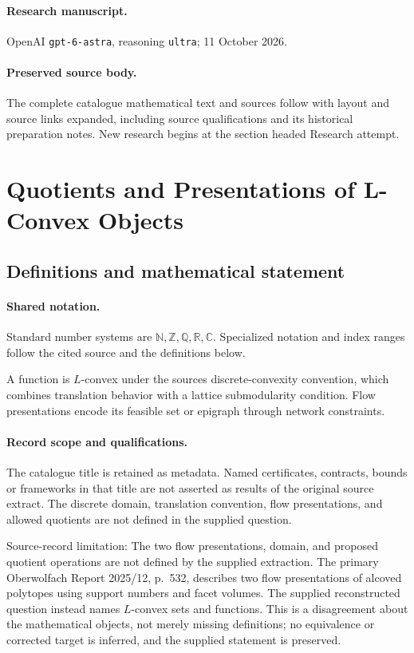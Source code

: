 \documentclass[11pt]{article}
\begin{document}
\paragraph{Research manuscript.} OpenAI \texttt{gpt-6-astra}, reasoning \texttt{ultra}; 11 October 2026.
\paragraph{Preserved source body.} The complete catalogue mathematical text and sources follow with layout and source links expanded, including source qualifications and its historical preparation notes. New research begins at the section headed Research attempt.

\section{Quotients and Presentations of L-Convex Objects}\label{statement}

\subsection{Definitions and mathematical statement}

\paragraph{Shared notation.}Standard number systems are $\mathbb N,\mathbb Z,\mathbb Q,\mathbb R,\mathbb C$. Specialized notation and index ranges follow the cited source and the definitions below.


A function is $L$-convex under the source\textquotesingle s discrete-convexity convention, which combines translation behavior with a lattice submodularity condition. Flow presentations encode its feasible set or epigraph through network constraints.
\paragraph{Record scope and qualifications.}
The catalogue title is retained as metadata. Named certificates, contracts, bounds or frameworks in that title are not asserted as results of the original source extract.
The discrete domain, translation convention, flow presentations, and allowed quotients are not defined in the supplied question.

Source-record limitation: The two flow presentations, domain, and proposed quotient operations are not defined by the supplied extraction. The primary Oberwolfach Report 2025/12, p.\ 532, describes two flow presentations of alcoved polytopes using support numbers and facet volumes. The supplied reconstructed question instead names $L$-convex sets and functions. This is a disagreement about the mathematical objects, not merely missing definitions; no equivalence or corrected target is inferred, and the supplied statement is preserved.
\end{document}
